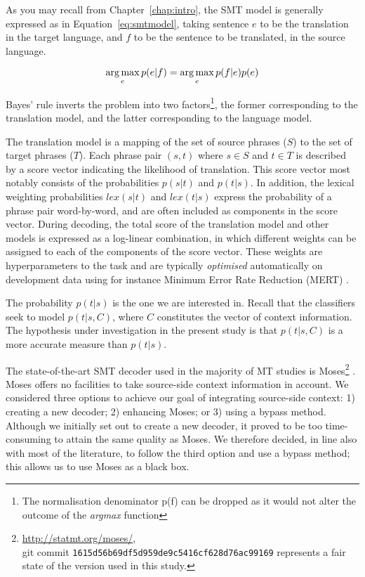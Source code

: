 As you may recall from Chapter~\ref{chap:intro}, the SMT model is generally expressed as in Equation~\ref{eq:smtmodel},
taking sentence $e$ to be the translation in the target language, and $f$ to be the sentence to be translated, in the
source language.

\begin{equation}
\operatorname*{arg\,max}_e p(e|f) = \operatorname*{arg\,max}_e p(f|e)p(e)
\label{eq:smtmodel}
\end{equation}

Bayes' rule inverts the problem into two factors\footnote{The normalisation
denominator p(f) can be dropped as it would not alter the outcome of the
\emph{argmax} function}, the former corresponding to the translation model, and
the latter corresponding to the language model.

The translation model is a mapping of the set of source phrases ($S$) to the
set of target phrases ($T$). Each phrase pair $(s,t)$ where $s \in S$ and $t
\in T$ is described by a score vector indicating the likelihood of
translation. This score vector most notably consists of the probabilities
$p(s|t)$ and $p(t|s)$. In addition, the lexical weighting probabilities $lex(s|t)$
and $lex(t|s)$ express the probability of a phrase pair word-by-word, and are
often included as components in the score vector. During decoding, the total
score of the translation model and other models is expressed as a log-linear
combination, in which different weights can be assigned to each of the
components of the score vector. These weights are hyperparameters to the task and
are typically \emph{optimised} automatically on development data using for instance
Minimum Error Rate Reduction (MERT) \citep{MERT}.

The probability $p(t|s)$ is the one we are interested in. Recall that the
classifiers seek to model $p(t|s,C)$, where $C$ constitutes the vector of
context information. The hypothesis under investigation in the present study is
that $p(t|s,C)$ is a more accurate measure than $p(t|s)$.

The state-of-the-art SMT decoder used in the majority of MT studies is
Moses\footnote{\url{http://statmt.org/moses/}, \\ git commit
\texttt{1615d56b69df5d959de9c5416cf628d76ac99169} represents a fair state of
the version used in this study.} \citep{MOSES}. Moses offers no facilities to
take source-side context information in account. We considered three options to
achieve our goal of integrating source-side context: 1) creating a new decoder;
2) enhancing Moses; or 3) using a bypass method. Although we initially set out
to create a new decoder, it proved to be too time-consuming to attain the same
quality as Moses.  We therefore decided, in line also with most of the
literature, to follow the third option and use a bypass method; this allows us
to use Moses as a black box.

